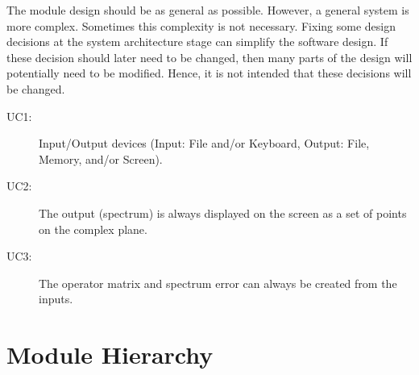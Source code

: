 \documentclass[12pt, titlepage]{article}
\begin{document}
The module design should be as general as possible. However, a general system is
more complex. Sometimes this complexity is not necessary. Fixing some design
decisions at the system architecture stage can simplify the software design. If
these decision should later need to be changed, then many parts of the design
will potentially need to be modified. Hence, it is not intended that these
decisions will be changed.

\begin{description}
\item[UC1:] Input/Output devices
  (Input: File and/or Keyboard, Output: File, Memory, and/or Screen).\\
\item[UC2:] The output (spectrum) is always displayed on the screen as a set of 
points on the complex plane. \\ 
\item[UC3:] The operator matrix and spectrum error can always be created from 
the inputs. \\

\end{description}

\section{Module Hierarchy} \label{SecMH}
\end{document}
